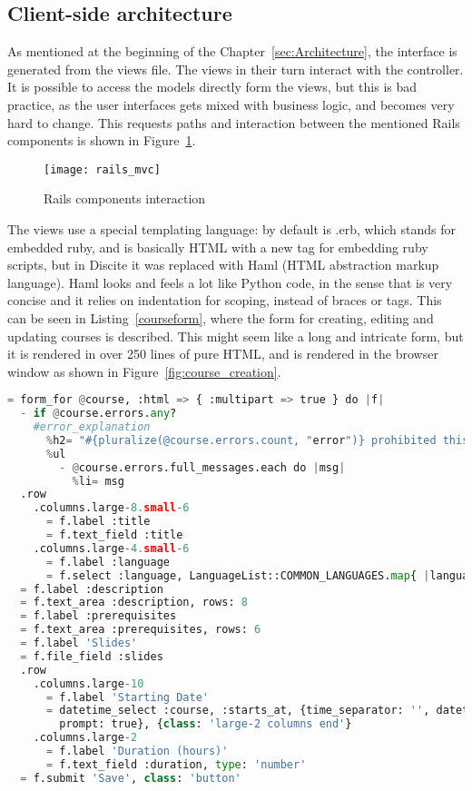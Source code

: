 \subsection{Client-side architecture}
As mentioned at the beginning of the Chapter~\ref{sec:Architecture}, the interface is generated from the views file.
The views in their turn interact with the controller. It is possible to access the models
directly form the views, but this is bad practice, as the user interfaces gets mixed with
business logic, and becomes very hard to change. This requests paths and interaction between
the mentioned Rails components is shown in Figure~\ref{rails_mvc}.
\begin{figure}[ht!]
\centering
\texttt{[image: rails\_mvc]}
\caption{Rails components interaction}
\label{rails_mvc}
\end{figure}

The views use a special templating language: by default is .erb, which stands for
embedded ruby, and is basically HTML with a new tag for embedding ruby scripts,
but in Discite it was replaced with Haml (HTML abstraction markup language). Haml
looks and feels a lot like Python code, in the sense that is very concise and it
relies on indentation for scoping, instead of braces or tags. This can be seen in
Listing~\ref{courseform}, where the form for creating, editing and updating courses
is described. This might seem like a long and intricate form, but it is
rendered in over 250 lines of pure HTML, and is rendered in the browser window as shown
in Figure~\ref{fig:course_creation}.
\begin{lstlisting}[language=Python, caption={Course creation template}, label=courseform]
= form_for @course, :html => { :multipart => true } do |f|
  - if @course.errors.any?
    #error_explanation
      %h2= "#{pluralize(@course.errors.count, "error")} prohibited this course from being saved:"
      %ul
        - @course.errors.full_messages.each do |msg|
          %li= msg
  .row
    .columns.large-8.small-6
      = f.label :title
      = f.text_field :title
    .columns.large-4.small-6
      = f.label :language
      = f.select :language, LanguageList::COMMON_LANGUAGES.map{ |language| [language.name, language.iso_639_1] }
  = f.label :description
  = f.text_area :description, rows: 8
  = f.label :prerequisites
  = f.text_area :prerequisites, rows: 6
  = f.label 'Slides'
  = f.file_field :slides
  .row
    .columns.large-10
      = f.label 'Starting Date'
      = datetime_select :course, :starts_at, {time_separator: '', datetime_separator: '',
        prompt: true}, {class: 'large-2 columns end'}
    .columns.large-2
      = f.label 'Duration (hours)'
      = f.text_field :duration, type: 'number'
  = f.submit 'Save', class: 'button'
\end{lstlisting}

